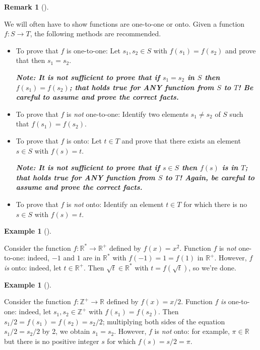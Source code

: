 \documentclass[10pt,]{book}
\newcommand{\alert}[1]{\textbf{\textit{#1}}}
\theoremstyle{plain}
\theoremstyle{definition}
\theoremstyle{definition}
\newtheorem{remark}[theorem]{Remark}
\theoremstyle{definition}
\newtheorem{example}[theorem]{Example}
\theoremstyle{definition}
\numberwithin{equation}{section}
\def\Z{\mathbb{Z}}
\def\R{\mathbb{R}}
\begin{document}
\begin{remark}[]\label{remark-2}

    We will often have to show functions are one-to-one or onto. Given a function \(f:S\to T\), the following methods are recommended.
%
\leavevmode%
\begin{itemize}[label=\textbullet]
\item{}
To prove that \(f\) is one-to-one: Let \(s_1,s_2 \in S\) with \(f(s_1)=f(s_2)\) and prove that then \(s_1=s_2\).%
\par

\alert{Note: It is \emph{not} sufficient to prove that if \(s_1=s_2\) in \(S\) then \(f(s_1)=f(s_2)\); that holds true for ANY function from \(S\) to \(T\)!  Be careful to \emph{assume} and \emph{prove} the correct facts.}%
\item{}
To prove that \(f\) is \emph{not} one-to-one: Identify two elements \(s_1 \neq s_2\) of \(S\) such that \(f(s_1)=f(s_2)\).
%
\item{}
To prove that \(f\) is onto: Let \(t\in T\) and prove that there exists an element \(s\in S\) with \(f(s)=t\).%
\par
\alert{Note: It is \emph{not} sufficient to prove that if \(s\in S\) then \(f(s)\) is in \(T\); that holds true for ANY function from \(S\) to \(T\)!  Again, be careful to \emph{assume} and \emph{prove} the correct facts.}%
\item{}
To prove that \(f\) is \emph{not} onto: Identify an element \(t\in T\) for which there is no \(s\in S\) with \(f(s)=t\).
%
\end{itemize}
\end{remark}
\begin{example}[]\label{example-6}

        Consider the function \(f: \R^* \to \R^+\) defined by \(f(x)=x^2\). Function \(f\) is \emph{not} one-to-one: indeed,
        \(-1\) and \(1\) are in \(\R^*\) with \(f(-1)=1=f(1)\) in \(\R^+\).
        However, \(f\) \emph{is} onto: indeed, let \(t\in \R^+\). Then
        \(\sqrt{t} \in \R^*\) with \(t=f(\sqrt{t})\), so we're done.
\end{example}
\begin{example}[]\label{example-7}

        Consider the function \(f: \Z^+ \to \R\) defined by \(f(x)=x/2\). Function \(f\) \emph{is} one-to-one: indeed, let \(s_1, s_2 \in \Z^+\) with \(f(s_1)=f(s_2)\).
        Then \(s_1/2=f(s_1)=f(s_2)=s_2/2\); multiplying both sides of the equation \(s_1/2=s_2/2\) by 2, we obtain \(s_1=s_2\). However, \(f\) is \emph{not} onto: for example, \(\pi\in \R\)
        but there is no positive integer \(s\) for which \(f(s)=s/2=\pi\).
\end{example}
\par
\end{document}
